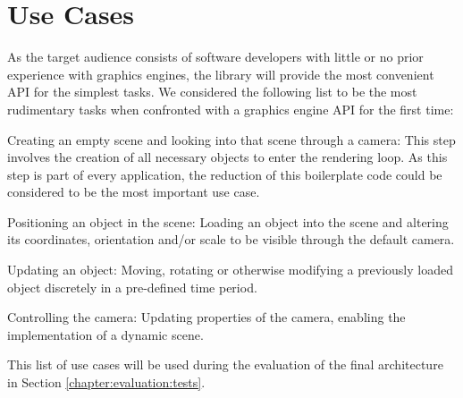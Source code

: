 \section{Use Cases}

	As the target audience consists of software developers with little or no prior experience with graphics engines, the library will provide the most convenient API for the simplest tasks. We considered the following list to be the most rudimentary tasks when confronted with a graphics engine API for the first time:

	\begin{smalllist}
		\item Creating an empty scene and looking into that scene through a camera: This step involves the creation of all necessary objects to enter the rendering loop. As this step is part of every application, the reduction of this boilerplate code could be considered to be the most important use case.
		\item Positioning an object in the scene: Loading an object into the scene and altering its coordinates, orientation and/or scale to be visible through the default camera.
		\item Updating an object: Moving, rotating or otherwise modifying a previously loaded object discretely in a pre-defined time period.
		\item Controlling the camera: Updating properties of the camera, enabling the implementation of a dynamic scene.
	\end{smalllist}

	This list of use cases will be used during the evaluation of the final architecture in Section \ref{chapter:evaluation:tests}.

